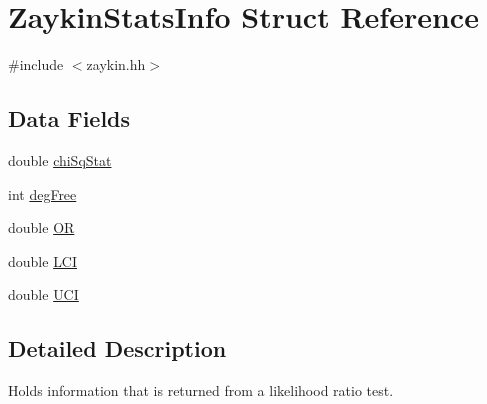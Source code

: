 \hypertarget{structZaykinStatsInfo}{
\section{ZaykinStatsInfo Struct Reference}
\label{structZaykinStatsInfo}
}


{\ttfamily \#include $<$zaykin.hh$>$}

\subsection*{Data Fields}
\begin{DoxyCompactItemize}
\item 
double \hyperlink{structZaykinStatsInfo_a28b66e969cdfd1f819ab622993aeea62}{chiSqStat}
\item 
int \hyperlink{structZaykinStatsInfo_aab543cdaa2227c8eda01598259bd0497}{degFree}
\item 
double \hyperlink{structZaykinStatsInfo_a75784cfcc143155568b6877fafe7c4a6}{OR}
\item 
double \hyperlink{structZaykinStatsInfo_a427af93fef8a99a23312fc42b14b85ae}{LCI}
\item 
double \hyperlink{structZaykinStatsInfo_ae32b8c048ddaddd014e5cb33943a3167}{UCI}
\end{DoxyCompactItemize}


\subsection{Detailed Description}
Holds information that is returned from a likelihood ratio test. 

